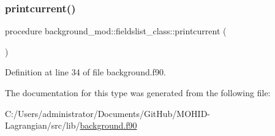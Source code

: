 \subsubsection{\texorpdfstring{printcurrent()}{printcurrent()}}
{\footnotesize\ttfamily procedure background\+\_\+mod\+::fieldslist\+\_\+class\+::printcurrent (\begin{DoxyParamCaption}{ }\end{DoxyParamCaption})\hspace{0.3cm}{\ttfamily [private]}}



Definition at line 34 of file background.\+f90.



The documentation for this type was generated from the following file\+:\begin{DoxyCompactItemize}
\item 
C\+:/\+Users/administrator/\+Documents/\+Git\+Hub/\+M\+O\+H\+I\+D-\/\+Lagrangian/src/lib/\mbox{\hyperlink{background_8f90}{background.\+f90}}\end{DoxyCompactItemize}
